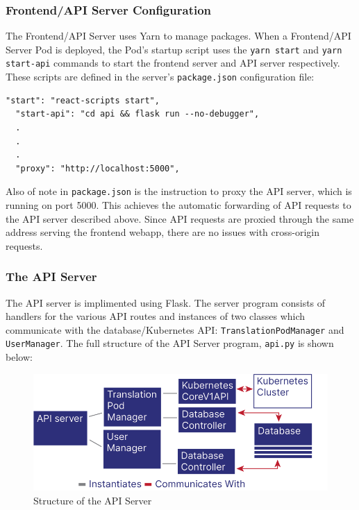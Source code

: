 \documentclass[12pt]{article}
\begin{document}
\subsubsection{Frontend/API Server Configuration}

The Frontend/API Server uses Yarn \cite{yarn} to manage packages.
When a Frontend/API Server Pod is deployed, the Pod's startup script
uses the \lstinline{yarn start} and \lstinline{yarn start-api}
commands to start the frontend server and API server respectively.
These scripts are defined in the server's \lstinline{package.json}
configuration file:\\

\begin{lstlisting}[basicstyle=\linespread{0.5}\ttfamily\small,caption={Frontend/API Server Configuration},captionpos=b]
  "start": "react-scripts start",
  "start-api": "cd api && flask run --no-debugger",
  .
  .
  .
  "proxy": "http://localhost:5000",
\end{lstlisting}

Also of note in \lstinline{package.json} is the instruction to proxy
the API server, which is running on port 5000.  This achieves the
automatic forwarding of API requests to the API server described
above.  Since API requests are proxied through the same address
serving the frontend webapp, there are no issues with cross-origin
requests.

\subsubsection{The API Server}

The API server is implimented using Flask.  The server program
consists of handlers for the various API routes and instances of two
classes which communicate with the database/Kubernetes API:
\lstinline{TranslationPodManager} and \lstinline{UserManager}.  The
full structure of the API Server program, \lstinline{api.py} is shown
below:

\begin{figure}[h!]

  \includegraphics[scale=1]{api_structure}
  \centering
  \caption{Structure of the API Server}
  \label{rr:detailed}
\end{figure}
\end{document}
